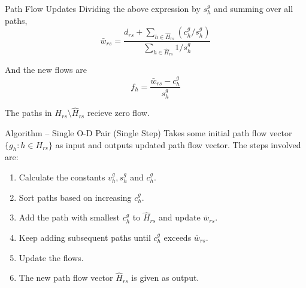 \documentclass{beamer}
\begin{document}
\begin{frame}{Path Flow Updates}
Dividing the above expression by $s_h^g$ and summing over
all paths,
\[
    \bar{w}_{rs} = \frac{d_{rs} + \sum_{h\in \hat{H}_{rs}}
    ({c_h^g}/{s_h^g})}{\sum_{h\in\hat{H}_{rs}}{1}/{s_h^g}}
\]

And the new flows are
\[
    f_h = \frac{\bar{w}_{rs}-c_h^g}{s^g_h}
\]

The paths in $H_{rs}\setminus \hat{H}_{rs}$ recieve
zero flow.
\end{frame}


\begin{frame}{Algorithm -- Single O-D Pair (Single Step)}
Takes some initial path flow vector $\{g_h: h\in H_{rs}\}$
as input and outputs updated path flow vector.
The steps involved are:
\begin{enumerate}
    \item Calculate the constants $v_h^g, s_h^g$ and
    $c_h^g$.

    \item Sort paths based on increasing $c_h^g$.

    \item Add the path with smallest $c_h^g$ to $\hat{H}_{rs}$
    and update $\bar{w}_{rs}$.

    \item Keep adding subsequent paths until $c_h^g$ exceeds
    $\bar{w}_{rs}$.

    \item Update the flows.

    \item The new path flow vector $\hat{H}_{rs}$ is given as
    output.
\end{enumerate}
\end{frame}
\end{document}
